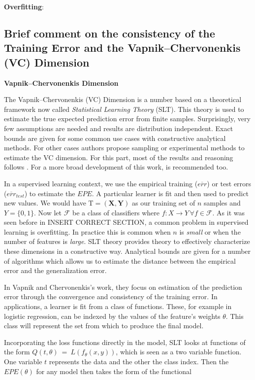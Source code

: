 
\textbf{Overfitting}: 


\subsection{Brief comment on the consistency of the Training Error and the Vapnik–Chervonenkis (VC) Dimension}
\textbf{Vapnik–Chervonenkis Dimension}
\cite{vapnik-nature2013}
\cite{cherkassky-learning2007}

The Vapnik–Chervonenkis (VC) Dimension is a number based on a theoretical framework now called \textit{Statistical Learning Theory} (SLT). This theory is used to estimate the true expected prediction error from finite samples. Surprisingly, very few assumptions are needed and results are distribution independent. Exact bounds are given for some common use cases with constructive analytical methods. For other cases authors propose sampling or experimental methods to estimate the VC dimension. For this part, most of the results and reasoning follows \cite{cherkassky-learning2007}. For a more broad development of this work, \cite{vapnik-nature2013} is recommended too.

In a supervised learning context, we use the empirical training ($\overline{err}$) or test errors ($\overline{err}_{test}$) to estimate the $EPE$. A particular learner is fit and then used to predict new values. We would have $\mathrm{T} = (\textbf{X},\textbf{Y})$ as our training set of $n$ samples   and $Y = \{0,1 \}$. Now let $\mathcal {F}$ be a class of classifiers where $f: X \rightarrow Y \, \forall f \in \mathcal {F}$. As it was seen before in INSERT CORRECT SECTION, a common problem in supervised learning is overfitting. In practice this is common when $n$ is \textit{small} or when the number of features is \textit{large}. SLT theory provides theory to effectively characterize these dimensions in a constructive way. Analytical bounds are given for a number of algorithms which allows us to estimate the distance between the empirical error and the generalization error.

In Vapnik and Chervonenkis's work, they focus on estimation of the prediction error through the convergence and consistency of the training error. In applications, a learner is fit from a class of functions. These, for example in logistic regression, can be indexed by the values of the feature's weights $\theta$. This class will represent the set from which to produce the final model.

Incorporating the loss functions directly in the model, SLT looks at functions of the form $Q(t,\theta) \ = \ L(f_\theta(x,y))$, which is seen as a two variable function. One variable $t$ represents the data and the other the class index. Then the $EPE(\theta)$ for any model then takes the form of the functional

